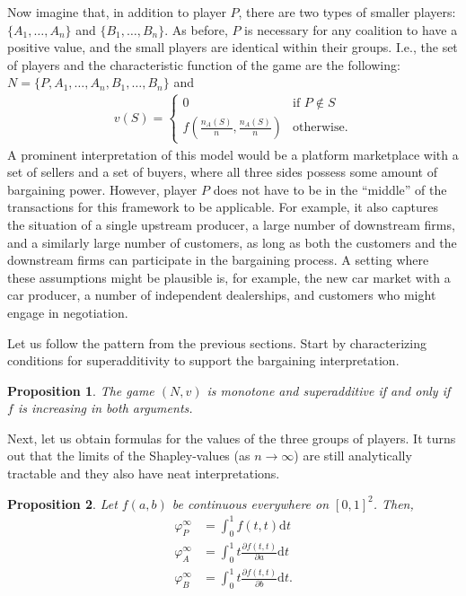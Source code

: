 \documentclass[a4paper]{article}
\newtheorem{proposition}{Proposition}
\newcommand{\dt}{\mathrm{d}t}
\begin{document}
Now imagine that, in addition to player $P$, there are two types of smaller players: $\{A_1, \dots, A_n\}$ and $\{B_1, \dots, B_n\}$. As before, $P$ is necessary for any coalition to have a positive value, and the small players are identical within their groups. I.e., the set of players and the characteristic function of the game are the following: $N = \{P, A_1, \dots, A_n, B_1, \dots, B_n\}$ and
\begin{align*}
    v(S) = \begin{cases}
        0                                                & \text{if } P \notin S \\
        f\left(\frac{n_A(S)}{n}, \frac{n_A(S)}{n}\right) & \text{otherwise}.
    \end{cases}
\end{align*}
A prominent interpretation of this model would be a platform marketplace with a set of sellers and a set of buyers, where all three sides possess some amount of bargaining power. However, player $P$ does not have to be in the ``middle'' of the transactions for this framework to be applicable. For example, it also captures the situation of a single upstream producer, a large number of downstream firms, and a similarly large number of customers, as long as both the customers and the downstream firms can participate in the bargaining process. A setting where these assumptions might be plausible is, for example, the new car market with a car producer, a number of independent dealerships, and customers who might engage in negotiation.

Let us follow the pattern from the previous sections. Start by characterizing conditions for superadditivity to support the bargaining interpretation.
\begin{proposition}
    The game $(N, v)$ is monotone and superadditive if and only if $f$ is increasing in both arguments.
\end{proposition}

Next, let us obtain formulas for the values of the three groups of players. It turns out that the limits of the Shapley-values (as $n \to \infty$) are still analytically tractable and they also have neat interpretations.

\begin{proposition}
    Let $f(a, b)$ be continuous everywhere on $[0, 1]^2$. Then,
    \begin{align*}
        \varphi_P^\infty & = \int_0^1 f(t, t) \dt                                 \\
        \varphi_A^\infty & = \int_0^1 t \frac{\partial f(t, t)}{\partial a} \dt   \\
        \varphi_B^\infty & = \int_0^1 t \frac{\partial f(t, t)}{\partial b} \dt .
    \end{align*}
\end{proposition}
\end{document}
